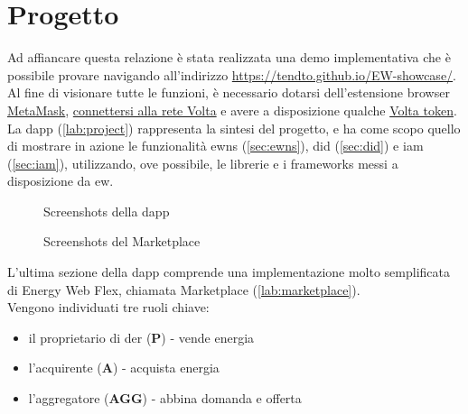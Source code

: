 \chapter*{Progetto}
Ad affiancare questa relazione è stata realizzata una demo implementativa che è possibile provare navigando all'indirizzo \url{https://tendto.github.io/EW-showcase/}.
Al fine di visionare tutte le funzioni, è necessario dotarsi dell'estensione browser \href{https://metamask.io/}{MetaMask}, \href{https://energyweb.atlassian.net/wiki/spaces/EWF/pages/703201459/Volta+Connecting+to+Remote+RPC+and+Metamask}{connettersi alla rete Volta} e avere a disposizione qualche \href{https://voltafaucet.energyweb.org/}{Volta token}. \\

La \gls{dapp} (\autoref{lab:project}) rappresenta la sintesi del progetto, e ha come scopo quello di mostrare in azione le funzionalità \gls{ewns} (\autoref{sec:ewns}), \gls{did} (\autoref{sec:did}) e \gls{iam} (\autoref{sec:iam}), utilizzando, ove possibile, le librerie e i frameworks messi a disposizione da \gls{ew}.

\begin{figure}[h]
    \centering
    \qquad
    \caption{Screenshots della \gls{dapp}}
    \label{lab:project}
\end{figure}

\begin{figure}[h]
    \centering
    \qquad
    \caption{Screenshots del Marketplace}
    \label{lab:marketplace}
\end{figure}

L'ultima sezione della \gls{dapp} comprende una implementazione molto semplificata di Energy Web Flex, chiamata Marketplace (\autoref{lab:marketplace}). \\

\newpage
Vengono individuati tre ruoli chiave: 
\begin{itemize}
    \item il proprietario di \gls{der} (\textbf{P}) - vende energia
    \item l'acquirente (\textbf{A}) - acquista energia
    \item l'aggregatore (\textbf{AGG}) - abbina domanda e offerta
\end{itemize}

